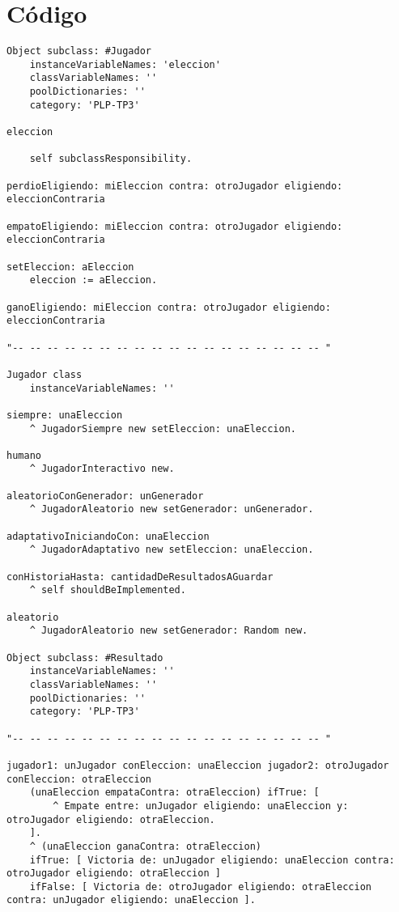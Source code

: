 \documentclass[10pt, a4paper,english,spanish,hidelinks]{article}
\begin{document}
\pagestyle{myheadings}
\maketitle
{}

\section{Código}


\begin{verbatim}
Object subclass: #Jugador
	instanceVariableNames: 'eleccion'
	classVariableNames: ''
	poolDictionaries: ''
	category: 'PLP-TP3'

eleccion

	self subclassResponsibility. 

perdioEligiendo: miEleccion contra: otroJugador eligiendo: eleccionContraria 

empatoEligiendo: miEleccion contra: otroJugador eligiendo: eleccionContraria 
	
setEleccion: aEleccion 
	eleccion := aEleccion. 

ganoEligiendo: miEleccion contra: otroJugador eligiendo: eleccionContraria 

"-- -- -- -- -- -- -- -- -- -- -- -- -- -- -- -- -- -- "

Jugador class
	instanceVariableNames: ''

siempre: unaEleccion
	^ JugadorSiempre new setEleccion: unaEleccion. 

humano
	^ JugadorInteractivo new. 

aleatorioConGenerador: unGenerador
	^ JugadorAleatorio new setGenerador: unGenerador. 

adaptativoIniciandoCon: unaEleccion
	^ JugadorAdaptativo new setEleccion: unaEleccion. 

conHistoriaHasta: cantidadDeResultadosAGuardar
	^ self shouldBeImplemented. 

aleatorio
	^ JugadorAleatorio new setGenerador: Random new. 

Object subclass: #Resultado
	instanceVariableNames: ''
	classVariableNames: ''
	poolDictionaries: ''
	category: 'PLP-TP3'

"-- -- -- -- -- -- -- -- -- -- -- -- -- -- -- -- -- -- "

jugador1: unJugador conEleccion: unaEleccion jugador2: otroJugador conEleccion: otraEleccion 
	(unaEleccion empataContra: otraEleccion) ifTrue: [
		^ Empate entre: unJugador eligiendo: unaEleccion y: otroJugador eligiendo: otraEleccion.
	].
	^ (unaEleccion ganaContra: otraEleccion)
	ifTrue: [ Victoria de: unJugador eligiendo: unaEleccion contra: otroJugador eligiendo: otraEleccion ]
	ifFalse: [ Victoria de: otroJugador eligiendo: otraEleccion contra: unJugador eligiendo: unaEleccion ]. 


\end{verbatim}
\end{document}
